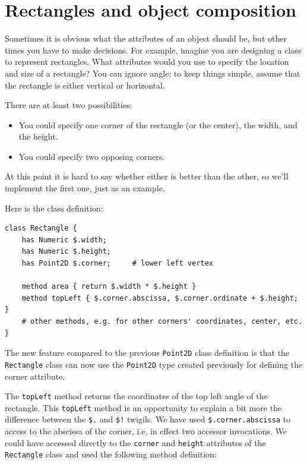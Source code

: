 \section{Rectangles and object composition}
\label{rectangles}

Sometimes it is obvious what the attributes of an object should be,
but other times you have to make decisions.  For example, imagine you
are designing a class to represent rectangles.  What attributes would
you use to specify the location and size of a rectangle?  You can
ignore angle; to keep things simple, assume that the rectangle is
either vertical or horizontal.

There are at least two possibilities: 

\begin{itemize}

\item You could specify one corner of the rectangle
(or the center), the width, and the height.

\item You could specify two opposing corners.

\end{itemize}

At this point it is hard to say whether either is better than
the other, so we'll implement the first one, just as an example.

Here is the class definition:

\begin{verbatim}
class Rectangle {
    has Numeric $.width;
    has Numeric $.height;
    has Point2D $.corner;     # lower left vertex 

    method area { return $.width * $.height }
    method topLeft { $.corner.abscissa, $.corner.ordinate + $.height; }
    # other methods, e.g. for other corners' coordinates, center, etc.
}
\end{verbatim}
%
The new feature compared to the previous {\tt Point2D} class 
definition is that the \verb'Rectangle' class can now use the 
{\tt Point2D} type created previously for defining the corner 
attribute. 

The {\tt topLeft} method returns the coordinates of 
the top left angle of the rectangle. This {\tt topLeft} 
method is an opportunity to explain a bit more 
the difference between the \verb'$.' and \verb'$!' twigils. We have 
used \verb'$.corner.abscissa' to access to the abscissa of 
the corner, i.e. in effect two accessor invocations. We could 
have accessed directly to the {\tt corner} and {\tt height} 
attributes of the {\tt Rectangle} class and used the following 
method definition:

